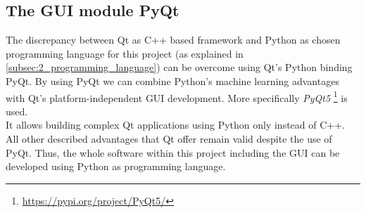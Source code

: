 \subsection*{The \acs*{GUI} module PyQt}\label{subsec:2_pyqt}
The discrepancy between Qt as C++ based framework and Python as chosen
programming language for this project (as explained in \autoref{subsec:2_programming_language})
can be overcome using Qt's Python binding PyQt.
By using PyQt we can combine Python's machine learning advantages with Qt's 
platform-independent \ac{GUI} development.
More specifically \textit{PyQt5} \footnote{\url{https://pypi.org/project/PyQt5/}} 
is used.\\
It allows building complex Qt applications using Python only instead of C++.
All other described advantages that Qt offer remain valid despite the use 
of PyQt.
Thus, the whole software within this project including the \ac{GUI} can be 
developed using Python as programming language.
